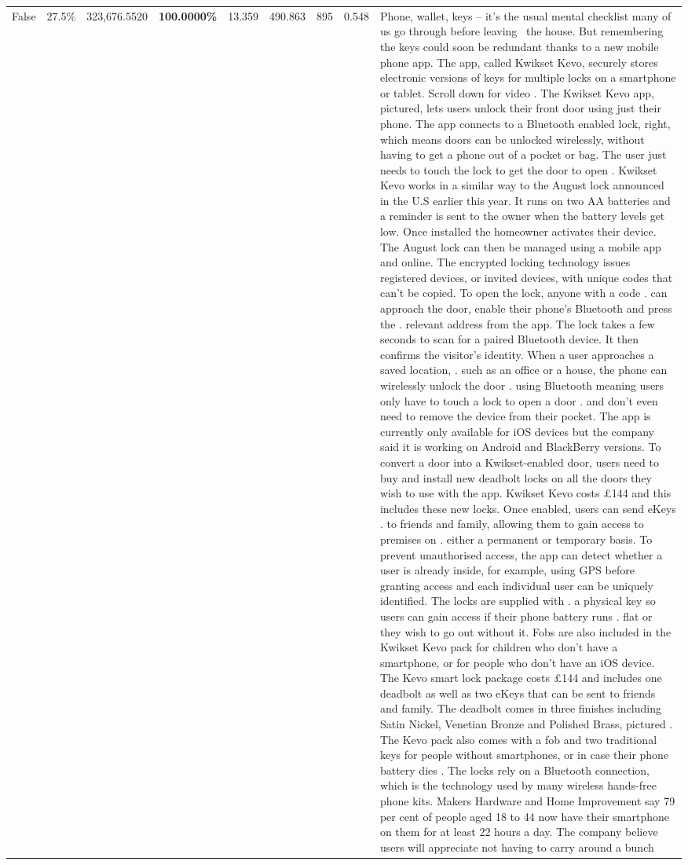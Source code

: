 \begin{table}[H]
\begin{tabular}{lllrlllll}
False & 27.5\% & 323,676.5520 & \bfseries \color{red} 100.0000\% & 13.359 & 490.863 & 895 & 0.548 & Phone, wallet, keys – it’s the usual mental checklist many of us go through before leaving  the house. But remembering the keys could soon be redundant thanks to a new mobile phone app. The app, called Kwikset Kevo, securely stores electronic versions of keys for multiple locks on a smartphone or tablet. Scroll down for video . The Kwikset Kevo app, pictured, lets users unlock their front door using just their phone. The app connects to a Bluetooth enabled lock, right, which means doors can be unlocked wirelessly, without having to get a phone out of a pocket or bag. The user just needs to touch the lock to get the door to open . Kwikset Kevo works in a similar way to the August lock announced in the U.S earlier this year. It runs on two AA batteries and a reminder is sent to the owner when the battery levels get low. Once installed the homeowner activates their device. The August lock can then be managed using a mobile app and online. The encrypted locking technology issues registered devices, or invited devices, with unique codes that can't be copied. To open the lock, anyone with a code . can approach the door, enable their phone's Bluetooth and press the . relevant address from the app. The lock takes a few seconds to scan for a paired Bluetooth device. It then confirms the visitor's identity. When a user approaches a saved location, . such as an office or a house, the phone can wirelessly unlock the door . using Bluetooth meaning users only have to touch a lock to open a door . and don't even need to remove the device from their pocket. The app is currently only available for iOS devices but the company said it is working on Android and BlackBerry versions. To convert a door into a Kwikset-enabled door, users need to buy and install new deadbolt locks on all the doors they wish to use with the app. Kwikset Kevo costs £144 and this includes these new locks. Once enabled, users can send eKeys . to friends and family, allowing them to gain access to premises on . either a permanent or temporary basis. To prevent unauthorised access, the app can detect whether a user is already inside, for example, using GPS before granting access and each individual user can be uniquely identified. The locks are supplied with . a physical key so users can gain access if their phone battery runs . flat or they wish to go out without it. Fobs are also included in the Kwikset Kevo pack for children who don't have a smartphone, or for people who don't have an iOS device. The Kevo smart lock package costs £144 and includes one deadbolt as well as two eKeys that can be sent to friends and family. The deadbolt comes in three finishes including Satin Nickel, Venetian Bronze and Polished Brass, pictured . The Kevo pack also comes with a fob and two traditional keys for people without smartphones, or in case their phone battery dies . The locks rely on a Bluetooth connection, which is the technology used by many wireless hands-free phone kits. Makers Hardware and Home Improvement say 79 per cent of people aged 18 to 44 now have their smartphone on them for at least 22 hours a day. The company believe users will appreciate not having to carry around a bunch 
\end{tabular}
\end{table}

